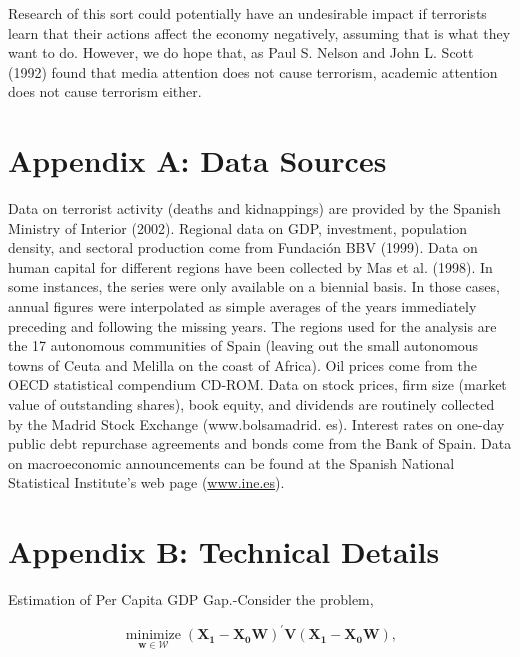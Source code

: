 \documentclass[10pt]{article}
\begin{document}
Research of this sort could potentially have an undesirable impact if terrorists learn that their actions affect the economy negatively, assuming that is what they want to do. However, we do hope that, as Paul S. Nelson and John L. Scott (1992) found that media attention does not cause terrorism, academic attention does not cause terrorism either.

\section*{Appendix A: Data Sources}
Data on terrorist activity (deaths and kidnappings) are provided by the Spanish Ministry of Interior (2002). Regional data on GDP, investment, population density, and sectoral production come from Fundación BBV (1999). Data on human capital for different regions have been collected by Mas et al. (1998). In some instances, the series were only available on a biennial basis. In those cases, annual figures were interpolated as simple averages of the years immediately preceding and following the missing years. The regions used for the analysis are the 17 autonomous communities of Spain (leaving out the small autonomous towns of Ceuta and Melilla on the coast of Africa). Oil prices come from the OECD statistical compendium CD-ROM. Data on stock prices, firm size (market value of outstanding shares), book equity, and dividends are routinely collected by the Madrid Stock Exchange (www.bolsamadrid. es). Interest rates on one-day public debt repurchase agreements and bonds come from the Bank of Spain. Data on macroeconomic announcements can be found at the Spanish National Statistical Institute's web page (\href{http://www.ine.es}{www.ine.es}).

\section*{Appendix B: Technical Details}
Estimation of Per Capita GDP Gap.-Consider the problem,

$$
\underset{\mathbf{w} \in \mathcal{W}}{\operatorname{minimize}}\left(\mathbf{X}_{\mathbf{1}}-\mathbf{X}_{\mathbf{0}} \mathbf{W}\right)^{\prime} \mathbf{V}\left(\mathbf{X}_{\mathbf{1}}-\mathbf{X}_{\mathbf{0}} \mathbf{W}\right),
$$
\end{document}
